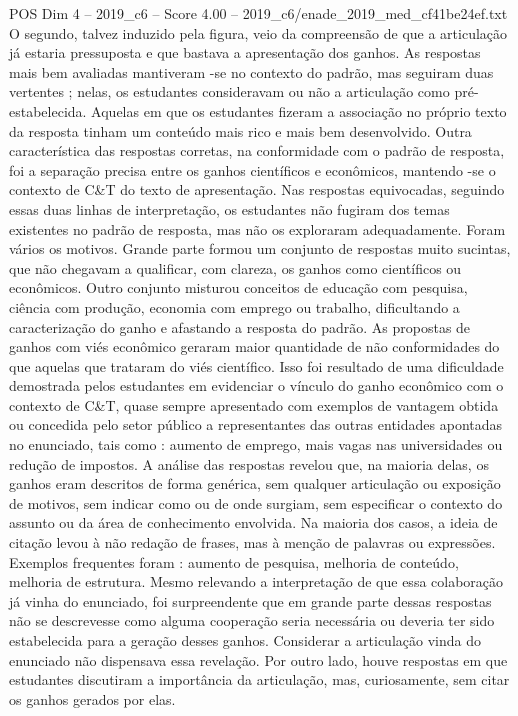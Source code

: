 \begin{textsample}{POS Dim 4 – 2019\_c6 – Score 4.00 – 2019\_c6/enade\_2019\_med\_cf41be24ef.txt}
O segundo, talvez induzido pela figura, veio da compreensão de que a articulação já estaria pressuposta e que bastava a apresentação dos ganhos.
As respostas mais bem avaliadas mantiveram -se no contexto do padrão, mas seguiram duas vertentes ; nelas, os estudantes consideravam ou não a articulação como pré-estabelecida.
Aquelas em que os estudantes fizeram a associação no próprio texto da resposta tinham um conteúdo mais rico e mais bem desenvolvido.
Outra característica das respostas corretas, na conformidade com o padrão de resposta, foi a separação precisa entre os ganhos científicos e econômicos, mantendo -se o contexto de C\&T do texto de apresentação.
Nas respostas equivocadas, seguindo essas duas linhas de interpretação, os estudantes não fugiram dos temas existentes no padrão de resposta, mas não os exploraram adequadamente.
Foram vários os motivos.
Grande parte formou um conjunto de respostas muito sucintas, que não chegavam a qualificar, com clareza, os ganhos como científicos ou econômicos.
Outro conjunto misturou conceitos de educação com pesquisa, ciência com produção, economia com emprego ou trabalho, dificultando a caracterização do ganho e afastando a resposta do padrão.
As propostas de ganhos com viés econômico geraram maior quantidade de não conformidades do que aquelas que trataram do viés científico.
Isso foi resultado de uma dificuldade demostrada pelos estudantes em evidenciar o vínculo do ganho econômico com o contexto de C\&T, quase sempre apresentado com exemplos de vantagem obtida ou concedida pelo setor público a representantes das outras entidades apontadas no enunciado, tais como : aumento de emprego, mais vagas nas universidades ou redução de impostos.
A análise das respostas revelou que, na maioria delas, os ganhos eram descritos de forma genérica, sem qualquer articulação ou exposição de motivos, sem indicar como ou de onde surgiam, sem especificar o contexto do assunto ou da área de conhecimento envolvida.
Na maioria dos casos, a ideia de citação levou à não redação de frases, mas à menção de palavras ou expressões.
Exemplos frequentes foram : aumento de pesquisa, melhoria de conteúdo, melhoria de estrutura.
Mesmo relevando a interpretação de que essa colaboração já vinha do enunciado, foi surpreendente que em grande parte dessas respostas não se descrevesse como alguma cooperação seria necessária ou deveria ter sido estabelecida para a geração desses ganhos.
Considerar a articulação vinda do enunciado não dispensava essa revelação.
Por outro lado, houve respostas em que estudantes discutiram a importância da articulação, mas, curiosamente, sem citar os ganhos gerados por elas.

\end{textsample}
